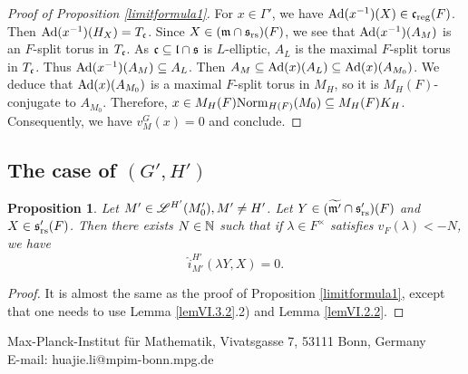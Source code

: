 \documentclass[a4paper]{amsart}
\newcommand{\fm}{{\mathfrak{m}}} \newcommand{\fn}{{\mathfrak{n}}}\newcommand{\fo}{{\mathfrak{o}}} \newcommand{\fp}{{\mathfrak{p}}}
\newcommand{\wt}{\widetilde}                        \newcommand{\wh}{\widehat}                      \newcommand{\wpair}[1]{\left\{{#1}\right\}}
\newtheorem{prop}[thm]{Proposition}
\theoremstyle{definition}
\theoremstyle{remark}
\numberwithin{equation}{subsection}
\begin{document}
\begin{proof}[Proof of Proposition \ref{limitformula1}]
For $x\in\Gamma'$, we have ${\mathrm{Ad}}(x^{-1})(X)\in{\mathfrak{c}}_{\mathrm{reg}}(F)$. Then ${\mathrm{Ad}}(x^{-1})(H_X)=T_{\mathfrak{c}}$. Since $X\in(\fm\cap\fs_\rs)(F)$, we see that ${\mathrm{Ad}}(x^{-1})(A_M)$ is an $F$-split torus in $T_{\mathfrak{c}}$. As ${\mathfrak{c}}\subseteq{\mathfrak{l}}\cap{\mathfrak{s}}$ is $L$-elliptic, $A_L$ is the maximal $F$-split torus in $T_{\mathfrak{c}}$. Thus ${\mathrm{Ad}}(x^{-1})(A_M)\subseteq A_L$. Then $A_M\subseteq {\mathrm{Ad}}(x)(A_L)\subseteq {\mathrm{Ad}}(x)(A_{M_0})$. We deduce that ${\mathrm{Ad}}(x)(A_{M_0})$ is a maximal $F$-split torus in $M_H$, so it is $M_H(F)$-conjugate to $A_{M_0}$. Therefore, $x\in M_H(F){\mathrm{Norm}}_{H(F)}(M_0)\subseteq M_H(F)K_H$. Consequently, we have $v_M^G(x)=0$ and conclude. 
\end{proof}

\subsection{The case of $(G',H')$}

\begin{prop}\label{limitformula2}
Let $M'\in\mathscr{L}^{H'}(M'_0), M'\neq H'$. Let $Y\in(\wt{\fm'}\cap\fs'_\rs)(F)$ and $X\in{\mathfrak{s}}'_{\mathrm{rs}}(F)$. Then there exists $N\in{\mathbb {N}}$ such that if $\lambda\in F^\times$ satisfies $v_F(\lambda)<-N$, we have
$$ \hat{i}_{M'}^{H'}(\lambda Y, X)=0. $$
\end{prop}

\begin{proof}
It is almost the same as the proof of Proposition \ref{limitformula1}, except that one needs to use Lemma \ref{lemVI.3.2}.2) and Lemma \ref{lemVI.2.2}. 
\end{proof}







\medskip

\begin{flushleft}
Max-Planck-Institut für Mathematik, Vivatsgasse 7, 53111 Bonn, Germany \\
\medskip
E-mail: huajie.li@mpim-bonn.mpg.de \\
\end{flushleft}
\end{document}
